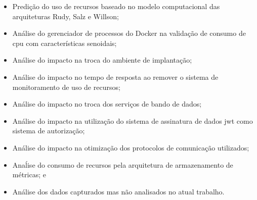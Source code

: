\begin{itemize}
 \item Predição do uso de recursos baseado no modelo computacional das arquiteturas Rudy, Salz e Willson;
 \item Análise do gerenciador de processos do Docker na validação de consumo de \ac{cpu} com características senoidais;
 \item Análise do impacto na troca do ambiente de implantação;
 \item Análise do impacto no tempo de resposta ao remover o sistema de monitoramento de uso de recursos;
 \item Análise do impacto no troca dos serviços de bando de dados;
 \item Análise do impacto na utilização do sistema de assinatura de dados \ac{jwt} como sistema de autorização;
 \item Análise do impacto na otimização dos protocolos de comunicação utilizados;
 \item Anaĺise do consumo de recursos pela arquitetura de armazenamento de métricas; e
 \item Análise dos dados capturados mas não analisados no atual trabalho.
\end{itemize}

